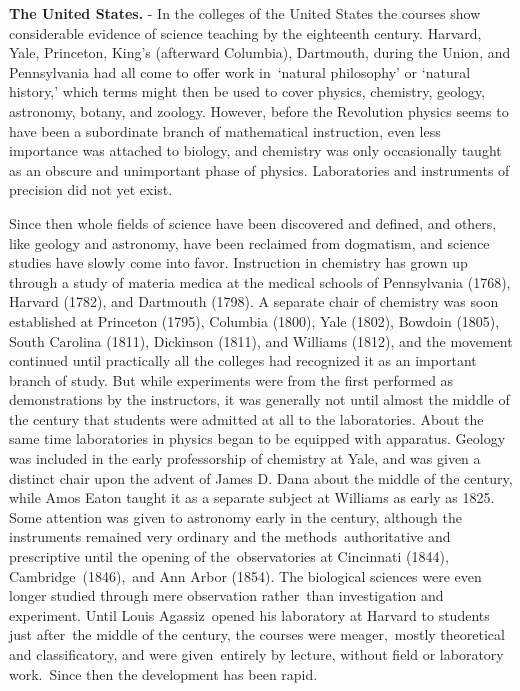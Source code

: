 \documentclass[]{book}
\begin{document}
\textbf{The United States.} - In the colleges of the United States the courses show considerable evidence of science teaching by the eighteenth century. Harvard, Yale, Princeton, King's (afterward Columbia), Dartmouth, during the Union, and Pennsylvania had all come to offer work in~`natural philosophy' or `natural history,' which terms might then be used to cover physics, chemistry, geology, astronomy, botany, and zoology. However, before the Revolution physics seems to have been a subordinate branch of mathematical instruction, even less importance was attached to biology, and chemistry was only occasionally taught as an obscure and unimportant phase of physics. Laboratories and instruments of precision did not yet exist.

Since then whole fields of science have been discovered and defined, and others, like geology and astronomy, have been reclaimed from dogmatism, and science studies have slowly come into favor. Instruction in chemistry has grown up through a study of materia medica at the medical schools of Pennsylvania (1768), Harvard (1782), and Dartmouth (1798). A separate chair of chemistry was soon established at Princeton (1795), Columbia (1800), Yale (1802), Bowdoin (1805), South Carolina (1811), Dickinson (1811), and Williams (1812), and the movement continued until practically all the colleges had recognized it as an important branch of study. But while experiments were from the first performed as demonstrations by the instructors, it was generally not until almost the middle of the century that students were admitted at all to the laboratories. About the same time laboratories in physics began to be equipped with apparatus. Geology was included in the early professorship of chemistry at Yale, and was given a distinct chair upon the advent of James D. Dana about the middle of the century, while Amos Eaton taught it as a separate subject at Williams as early as 1825. Some attention was given to astronomy early in the century, although the instruments remained very ordinary and the methods~authoritative and prescriptive until the opening of the~observatories at Cincinnati (1844), Cambridge~(1846),~and Ann Arbor (1854). The biological sciences were even longer studied through mere observation rather~than investigation and experiment. Until Louis Agassiz~opened his laboratory at Harvard to students just after~the middle of the century, the courses were meager,~mostly theoretical and classificatory, and were given~entirely by lecture, without field or laboratory work.~Since then the development has been rapid.
\end{document}
